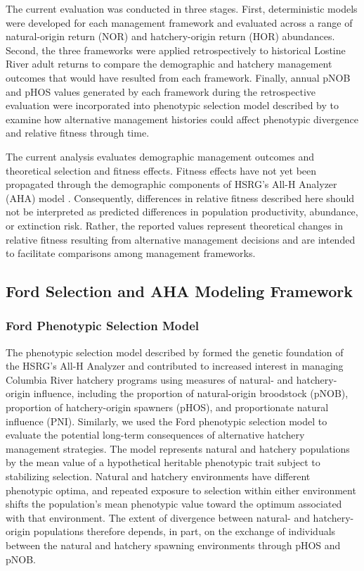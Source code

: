 \documentclass[12pt,letterpaper]{article}
\begin{document}
The current evaluation was conducted in three stages. First, deterministic models were developed for each management framework and evaluated across a range of natural-origin return (NOR) and hatchery-origin return (HOR) abundances. Second, the three frameworks were applied retrospectively to historical Lostine River adult returns to compare the demographic and hatchery management outcomes that would have resulted from each framework. Finally, annual pNOB and pHOS values generated by each framework during the retrospective evaluation were incorporated into phenotypic selection model described by \textcite{ford_selection_2002} to examine how alternative management histories could affect phenotypic divergence and relative fitness through time.

The current analysis evaluates demographic management outcomes and theoretical selection and fitness effects. Fitness effects have not yet been propagated through the demographic components of HSRG's All-H Analyzer (AHA) model \autocite{HSRG2020AHA}. Consequently, differences in relative fitness described here should not be interpreted as predicted differences in population productivity, abundance, or extinction risk. Rather, the reported values represent theoretical changes in relative fitness resulting from alternative management decisions and are intended to facilitate comparisons among management frameworks.

\subsection{Ford Selection and AHA Modeling Framework}\label{ford-selection-and-aha-modeling-framework}

\subsubsection{Ford Phenotypic Selection Model}\label{ford-phenotypic-selection-model}

The phenotypic selection model described by \textcite{ford_selection_2002} formed the genetic foundation of the HSRG's All-H Analyzer and contributed to increased interest in managing Columbia River hatchery programs using measures of natural- and hatchery-origin influence, including the proportion of natural-origin broodstock (pNOB), proportion of hatchery-origin spawners (pHOS), and proportionate natural influence (PNI). Similarly, we used the Ford phenotypic selection model to evaluate the potential long-term consequences of alternative hatchery management strategies. The model represents natural and hatchery populations by the mean value of a hypothetical heritable phenotypic trait subject to stabilizing selection. Natural and hatchery environments have different phenotypic optima, and repeated exposure to selection within either environment shifts the population's mean phenotypic value toward the optimum associated with that environment. The extent of divergence between natural- and hatchery-origin populations therefore depends, in part, on the exchange of individuals between the natural and hatchery spawning environments through pHOS and pNOB.
\end{document}
